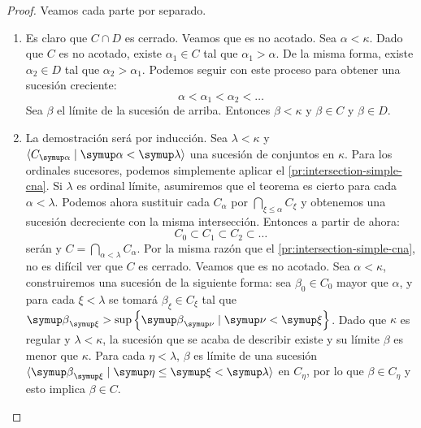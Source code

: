 \begin{proof}
    Veamos cada parte por separado.

    \begin{enumerate}[label=\alph*)]
        \item\label{pr:intersection-simple-cna}
            Es claro que $C\cap D$ es cerrado. Veamos que es no acotado.
            Sea $\alpha<\kappa$. Dado que $C$ es no acotado, existe $\alpha_1\in C$
            tal que $\alpha_1 > \alpha$. De la misma forma, existe $\alpha_2\in D$
            tal que $\alpha_2 > \alpha_1$. Podemos seguir con este proceso para obtener
            una sucesión creciente:
            \[
                \alpha < \alpha_1 < \alpha_2 < \dots
            \]
            Sea $\beta$ el límite de la sucesión de arriba.
            Entonces $\beta < \kappa$ y $\beta\in C$ y $\beta\in D$.


        \item\label{pr:intersection-cna}
            La demostración será por inducción.
            Sea $\lambda<\kappa$ y $\seq{C_\alpha\mid\alpha<\lambda}$
            una sucesión de conjuntos \cna{} en $\kappa$.
            Para los ordinales sucesores, podemos simplemente aplicar
            el \cref{pr:intersection-simple-cna}.
            Si $\lambda$ es ordinal límite, asumiremos que el teorema
            es cierto para cada $\alpha<\lambda$. Podemos ahora sustituir
            cada $C_\alpha$ por $\bigcap_{\xi\leq\alpha} C_\xi$ y obtenemos
            una sucesión decreciente con la misma intersección. Entonces a partir de ahora:
            \[
                C_0 \subset C_1 \subset C_2 \subset \dots
            \]
            serán \cna{} y $C = \bigcap_{\alpha<\lambda} C_\alpha$.
            Por la misma razón que el \cref{pr:intersection-simple-cna}, no es difícil
            ver que $C$ es cerrado. Veamos que es no acotado. Sea $\alpha<\kappa$,
            construiremos una sucesión de la siguiente forma: sea $\beta_0\in C_0$ mayor que
            $\alpha$, y para cada $\xi<\lambda$ se tomará $\beta_\xi\in C_\xi$
            tal que $\beta_\xi > \sup\set{\beta_\nu\mid\nu<\xi}$.
            Dado que $\kappa$ es regular y $\lambda<\kappa$, la sucesión que se acaba de
            describir existe y su límite $\beta$ es menor que $\kappa$.
            Para cada $\eta<\lambda$, $\beta$ es límite de una sucesión
            $\seq{\beta_\xi\mid\eta\leq\xi<\lambda}$ en $C_\eta$, por lo que
            $\beta\in C_\eta$ y esto implica $\beta\in C$.



\end{enumerate}
\end{proof}
